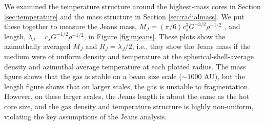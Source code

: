 \documentclass{aa}
\begin{document}
We examined the temperature structure around the highest-mass cores in Section
\ref{sec:temperature} and the mass structure in Section \ref{sec:radialmass}.
We put these together to measure the Jeans mass, $M_J = (\pi / 6) c_s^3
G^{-3/2} \rho^{-1/2}$
, and length, $\lambda_J = c_s G^{-1/2} \rho^{-1/2}$, 
in
Figure \ref{fig:mjeans}.  These plots show the azimuthally averaged $M_J$
and $R_J=\lambda_J/2$,
i.e., they show the Jeans mass if the medium
were of uniform density and temperature at the spherical-shell-average density
and azimuthal average temperature at each plotted radius.
The mass figure shows that the gas is stable on a beam size scale ($\sim1000$ AU),
but the length figure shows that on larger scales, the gas is unstable to
fragmentation.  However, on these larger scales, the Jeans length is about
the same as the hot core size, and the gas density and temperature structure is
highly non-uniform, violating the key assumptions of the Jeans analysis.  


\end{document}
